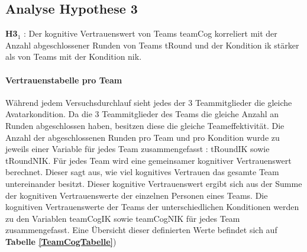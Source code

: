 \documentclass[a4paper,11pt]{article}%
\renewcommand{\\}{\vspace*{0.5\baselineskip} \newline}
\begin{document}
\subsection{Analyse Hypothese 3}
\textbf{H3$_{1}$} : Der kognitive Vertrauenswert von Teams \ac{teamCog} korreliert mit der Anzahl abgeschlossener Runden von Teams \ac{tRound} und der Kondition \ac{ik} stärker als von Teams mit der Kondition \ac{nik}.
%
%
%
\paragraph{Vertrauenstabelle pro Team}
Während jedem Versuchsdurchlauf sieht jedes der 3 Teammitglieder die gleiche Avatarkondition. Da die 3 Teammitglieder des Teams die gleiche Anzahl an Runden abgeschlossen haben, besitzen diese die gleiche Teameffektivität. Die Anzahl der abgeschlossenen Runden pro Team und pro Kondition wurde zu jeweils einer Variable für jedes Team zusammengefasst : \ac{tRoundIK} sowie \ac{tRoundNIK}. Für jedes Team wird eine gemeinsamer kognitiver Vertrauenswert berechnet. Dieser sagt aus, wie viel kognitives Vertrauen das gesamte Team untereinander besitzt. Dieser kognitive Vertrauenswert ergibt sich aus der Summe der kognitiven Vertrauenswerte der einzelnen Personen eines Teams. Die kognitiven Vertrauenswerte der Teams der unterschiedlichen Konditionen werden zu den Variablen \ac{teamCogIK} sowie \ac{teamCogNIK} für jedes Team zusammengefasst. Eine Übersicht dieser definierten Werte befindet sich auf \textbf{Tabelle \ref{TeamCogTabelle}})
\end{document}
